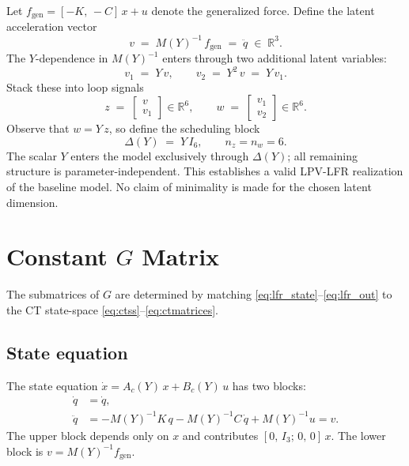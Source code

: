\documentclass[11pt]{article}
\newcommand{\R}{\mathbb{R}}
\begin{document}
Let $f_\mathrm{gen} = [-K,\,-C]\,x + u$ denote the generalized force.
Define the latent acceleration vector
\begin{equation}
    v \;=\; M(Y)^{-1}\,f_\mathrm{gen} \;=\; \ddot{q} \;\in\; \R^3.
    \label{eq:latent_v}
\end{equation}
The $Y$-dependence in $M(Y)^{-1}$ enters through two additional latent variables:
\begin{equation}
    v_1 \;=\; Y\,v, \qquad v_2 \;=\; Y^2\,v \;=\; Y\,v_1.
    \label{eq:latent_v1v2}
\end{equation}
Stack these into loop signals
\begin{equation}
    z \;=\; \begin{bmatrix} v \\ v_1 \end{bmatrix} \in \R^6,
    \qquad
    w \;=\; \begin{bmatrix} v_1 \\ v_2 \end{bmatrix} \in \R^6.
    \label{eq:zw}
\end{equation}
Observe that $w = Y\,z$, so define the scheduling block
\begin{equation}
    \Delta(Y) \;=\; Y\,I_6, \qquad n_z = n_w = 6.
    \label{eq:Delta}
\end{equation}
The scalar $Y$ enters the model exclusively through $\Delta(Y)$;
all remaining structure is parameter-independent.
This establishes a valid LPV-LFR realization of the baseline model.
No claim of minimality is made for the chosen latent dimension.

\section{Constant \texorpdfstring{$G$}{G} Matrix}

The submatrices of $G$ are determined by matching \eqref{eq:lfr_state}--\eqref{eq:lfr_out}
to the CT state-space \eqref{eq:ctss}--\eqref{eq:ctmatrices}.

\subsection{State equation}

The state equation $\dot{x} = A_c(Y)\,x + B_c(Y)\,u$ has two blocks:
\begin{align}
    \dot{q}   &= \dot{q}, \label{eq:upper}\\
    \ddot{q}  &= -M(Y)^{-1}K\,q - M(Y)^{-1}C\,\dot{q} + M(Y)^{-1}u = v. \label{eq:lower}
\end{align}
The upper block depends only on $x$ and contributes $[0,\,I_3;\,0,\,0]\,x$.
The lower block is $v = M(Y)^{-1}f_\mathrm{gen}$.
\end{document}
